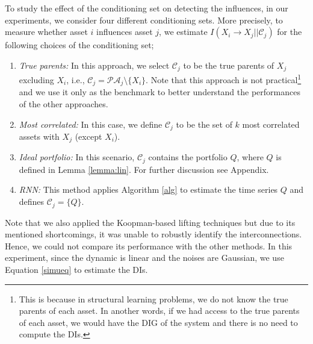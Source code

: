 To study the effect of the conditioning set on detecting the influences, in our experiments, we consider four different conditioning sets.
More precisely, to measure whether asset $i$ influences asset $j$, we estimate $I(X_i\rightarrow X_j||\mathcal{C}_j)$ for the following choices of the conditioning set; 
\begin{enumerate}
    \item \textit{True parents:} In this approach, we select $\mathcal{C}_j$ to be the true parents of $X_j$ excluding $X_i$, i.e., $\mathcal{C}_j=\mathcal{PA}_{j}\setminus\{X_i\}$.
    Note that this approach is not practical\footnote{This is because in structural learning problems, we do not know the true parents of each asset. In another words, if we had access to the true parents of each asset, we would have the DIG of the system and there is no need to compute the DIs.} and we use it only as the benchmark to better understand the performances of the other approaches. 
    
    \item \textit{Most correlated:} In this case, we define $\mathcal{C}_j$ to be the set of $k$ most correlated assets with $X_j$ (except $X_i$).
    
    \item \textit{Ideal portfolio:} In this scenario, $\mathcal{C}_j$ contains the portfolio $Q$, where $Q$ is defined in Lemma \ref{lemma:lin}.
    For further discussion see Appendix. 
    
    \item \textit{RNN:} This method applies Algorithm \ref{alg} to estimate the time series $Q$ and defines $\mathcal{C}_j=\{Q\}$.
    
\end{enumerate}
Note that we also applied the Koopman-based lifting techniques but due to its mentioned shortcomings, it was unable to robustly identify the interconnections. 
Hence, we could not compare its performance with the other methods. 
In this experiment, since the dynamic is linear and the noises are Gaussian, we use Equation \eqref{simueq} to estimate the DIs. 
